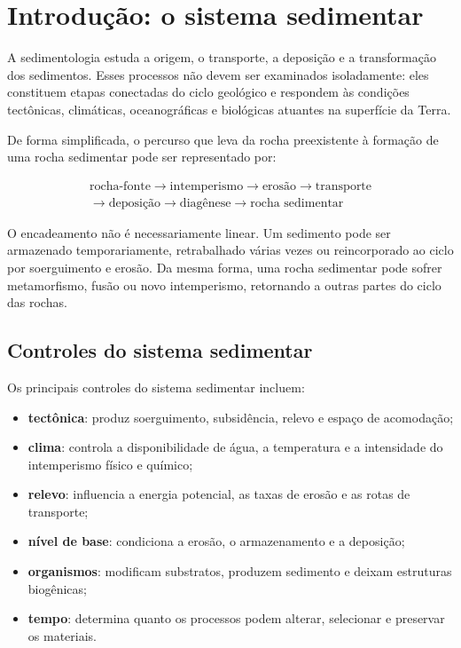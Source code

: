 \section{Introdução: o sistema sedimentar}

A sedimentologia estuda a origem, o transporte, a deposição e a transformação dos
sedimentos. Esses processos não devem ser examinados isoladamente: eles constituem
etapas conectadas do ciclo geológico e respondem às condições tectônicas, climáticas,
oceanográficas e biológicas atuantes na superfície da Terra.

De forma simplificada, o percurso que leva da rocha preexistente à formação de uma
rocha sedimentar pode ser representado por:

\[
\boxed{
\begin{gathered}
\text{rocha-fonte}
\rightarrow \text{intemperismo}
\rightarrow \text{erosão}
\rightarrow \text{transporte}
\\
\rightarrow \text{deposição}
\rightarrow \text{diagênese}
\rightarrow \text{rocha sedimentar}
\end{gathered}
}
\]

O encadeamento não é necessariamente linear. Um sedimento pode ser armazenado
temporariamente, retrabalhado várias vezes ou reincorporado ao ciclo por soerguimento e
erosão. Da mesma forma, uma rocha sedimentar pode sofrer metamorfismo, fusão ou novo
intemperismo, retornando a outras partes do ciclo das rochas.

\subsection{Controles do sistema sedimentar}

Os principais controles do sistema sedimentar incluem:

\begin{itemize}
  \item \textbf{tectônica}: produz soerguimento, subsidência, relevo e espaço de acomodação;
  \item \textbf{clima}: controla a disponibilidade de água, a temperatura e a intensidade
        do intemperismo físico e químico;
  \item \textbf{relevo}: influencia a energia potencial, as taxas de erosão e as rotas de
        transporte;
  \item \textbf{nível de base}: condiciona a erosão, o armazenamento e a deposição;
  \item \textbf{organismos}: modificam substratos, produzem sedimento e deixam estruturas
        biogênicas;
  \item \textbf{tempo}: determina quanto os processos podem alterar, selecionar e preservar
        os materiais.
\end{itemize}

